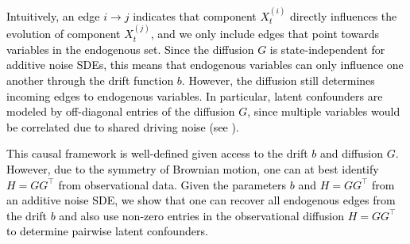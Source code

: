 \documentclass[twoside,11pt]{article}
\newcommand{\rv}[1]{\textcolor{black}{#1}}
\begin{document}
\rv{Intuitively, an edge $i \to j$ indicates that component $X_t^{(i)}$ directly influences the evolution of component $X_t^{(j)}$, and we only include edges that point towards variables in the endogenous set. Since the diffusion $G$ is state-independent for additive noise SDEs, this means that endogenous variables can only influence one another through the drift function $b$. However, the diffusion still determines incoming edges to endogenous variables. In particular, latent confounders are modeled by off-diagonal entries of the diffusion $G$, since multiple variables would be correlated due to shared driving noise (see \citep[Figure 1]{boeken2024dynamic}).} 

\rv{This causal framework is well-defined given access to the drift $b$ and diffusion $G$. However, due to the symmetry of Brownian motion, one can at best identify $H= GG^\top$ from observational data. Given the parameters $b$ and $H= GG^\top$ from an additive noise SDE, we show that one can recover all endogenous edges from the drift $b$ and also use non-zero entries in the observational diffusion $H= GG^\top$ to determine pairwise latent confounders.}







\end{document}
